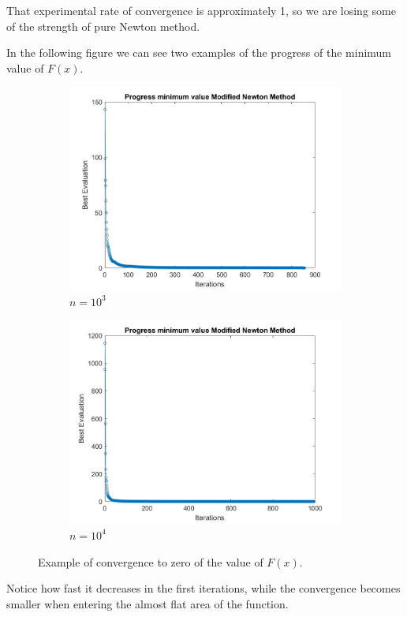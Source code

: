 That experimental rate of convergence is approximately 1, so we are losing some of the strength of pure Newton method. 

In the following figure we can see two examples of the progress of the minimum value of $F(x)$.
\begin{figure}[htbp]
    \centering
    \begin{subfigure}[t]{0.45\textwidth}  %
        \centering
        \includegraphics[width=\textwidth]{img/pb75_1e3_MN_convergence.jpg}
        \caption{$n=10^3$}
    \end{subfigure}
    \hspace{1cm} %
    \begin{subfigure}[t]{0.45\textwidth}
        \centering
        \includegraphics[width=\textwidth]{img/pb75_1e4_MN_convergence.jpg}
        \caption{$n=10^4$}
    \end{subfigure}
    \caption{Example of convergence to zero of the value of $F(x)$.}
    \label{convergenze MN 75}
\end{figure}
Notice how fast it decreases in the first iterations, while the convergence becomes smaller when entering the almost flat area of the function.

